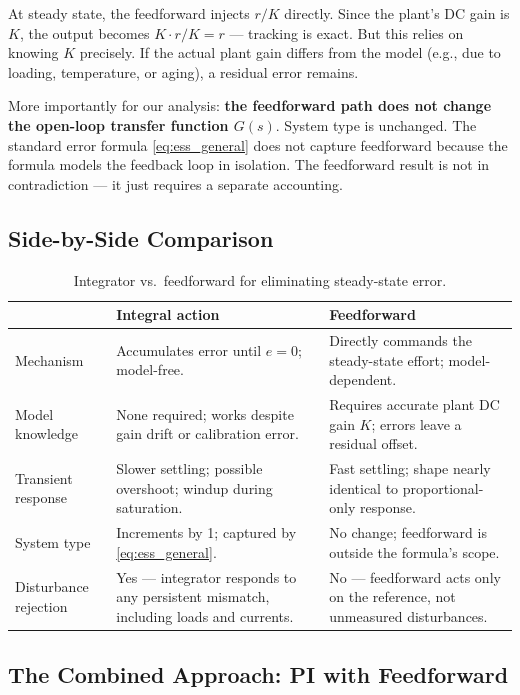 \documentclass[../../book.tex]{subfiles}
\begin{document}
At steady state, the feedforward injects $r/K$ directly.  Since the plant's
DC gain is $K$, the output becomes $K \cdot r/K = r$ --- tracking is exact.
But this relies on knowing $K$ precisely.  If the actual plant gain differs
from the model (e.g., due to loading, temperature, or aging), a residual
error remains.

More importantly for our analysis: \textbf{the feedforward path does not
change the open-loop transfer function $G(s)$}.  System type is unchanged.
The standard error formula \cref{eq:ess_general} does not capture feedforward
because the formula models the feedback loop in isolation.  The feedforward
result is not in contradiction --- it just requires a separate accounting.

\subsection{Side-by-Side Comparison}

\begin{table}[htbp]
\centering
\caption{Integrator vs.\ feedforward for eliminating steady-state error.}
\label{tab:int_vs_ff}
\begin{tabular}{p{2.4cm}p{5.0cm}p{5.0cm}}
\toprule
 & \textbf{Integral action} & \textbf{Feedforward} \\
\midrule
Mechanism
  & Accumulates error until $e = 0$; model-free.
  & Directly commands the steady-state effort; model-dependent. \\[4pt]
Model knowledge
  & None required; works despite gain drift or calibration error.
  & Requires accurate plant DC gain $K$; errors leave a residual offset. \\[4pt]
Transient response
  & Slower settling; possible overshoot; windup during saturation.
  & Fast settling; shape nearly identical to proportional-only response. \\[4pt]
System type
  & Increments by 1; captured by \cref{eq:ess_general}.
  & No change; feedforward is outside the formula's scope. \\[4pt]
Disturbance rejection
  & Yes --- integrator responds to any persistent mismatch, including loads and currents.
  & No --- feedforward acts only on the reference, not unmeasured disturbances. \\[4pt]
\bottomrule
\end{tabular}
\end{table}

\subsection{The Combined Approach: PI with Feedforward}
\end{document}
